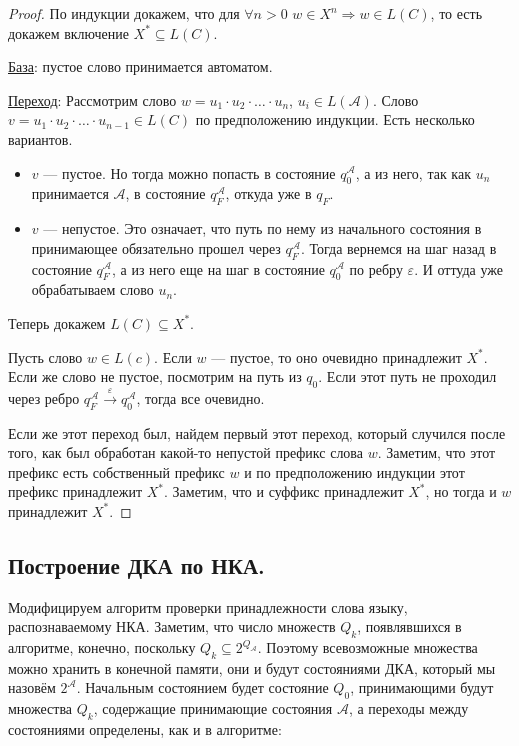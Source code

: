 \begin{proof}

  По индукции докажем, что для $\forall n>0$ $w\in X^n\Rightarrow w\in L(C)$, то есть докажем включение $X^*\subseteq L(C)$.

  \underline{База}: пустое слово принимается автоматом.

  \underline{Переход}: Рассмотрим слово $w=u_1\cdot u_2\cdot\ldots\cdot u_n$, $u_i\in L(\mathcal{A})$. Слово
  $v=u_1\cdot u_2\cdot\ldots\cdot u_{n-1}\in L(C)$ по предположению индукции. Есть несколько вариантов.
  \begin{itemize}
    \item $v$ --- пустое. Но тогда можно попасть в состояние $q_0^{\mathcal{A}}$, а из него, так как $u_n$ принимается $\mathcal{A}$,
          в состояние $q_F^{\mathcal{A}}$, откуда уже в $q_F$.
    \item $v$ --- непустое. Это означает, что путь по нему из начального состояния в принимающее обязательно прошел через
          $q_F^{\mathcal{A}}$. Тогда вернемся на шаг назад в состояние $q_F^{\mathcal{A}}$, а из него еще на шаг в состояние
          $q_0^{\mathcal{A}}$ по ребру $\varepsilon$. И оттуда уже обрабатываем слово $u_n$.
  \end{itemize}

  Теперь докажем $L(C)\subseteq X^*$.

  Пусть слово $w\in L(c)$. Если $w$ --- пустое, то оно очевидно принадлежит $X^*$. Если же слово не пустое, посмотрим на путь из $q_0$.
  Если этот путь не проходил через ребро $q_F^{\mathcal{A}}\xrightarrow{\varepsilon} q_0^{\mathcal{A}}$, тогда все очевидно.

  Если же этот переход был, найдем первый этот переход, который случился после того, как был обработан какой-то непустой префикс слова $w$.
  Заметим, что этот префикс есть собственный префикс $w$ и по предположению индукции этот префикс принадлежит $X^*$. Заметим, что и суффикс принадлежит
  $X^*$, но тогда и $w$ принадлежит $X^*$.

\end{proof}


\subsection{Построение ДКА по НКА.}

Модифицируем алгоритм проверки принадлежности слова языку, распознаваемому НКА. Заметим, что число множеств $Q_k$,
появлявшихся в алгоритме, конечно, поскольку $Q_k \subseteq 2^{Q_{\mathcal{A}}}$. Поэтому всевозможные множества
можно хранить в конечной памяти, они и будут состояниями ДКА, который мы назовём $2^{\mathcal{A}}$.
Начальным состоянием будет состояние $Q_0$,
принимающими будут множества $Q_k$, содержащие принимающие состояния $\mathcal{A}$, а переходы между состояниями определены, как и в алгоритме:

